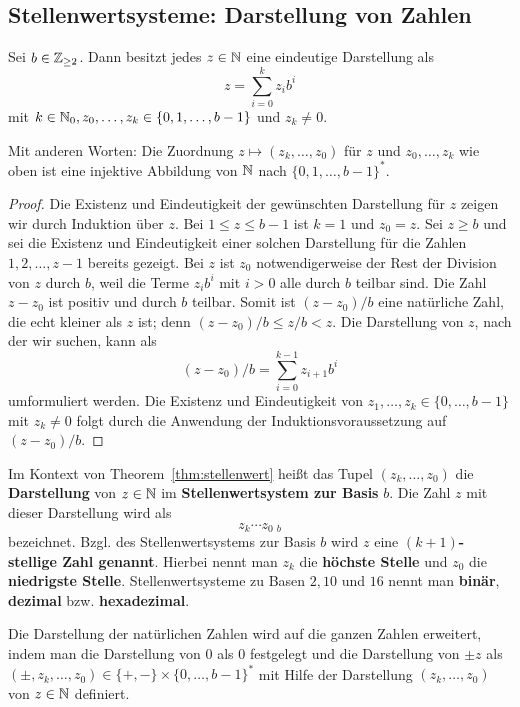 \subsection{Stellenwertsysteme: Darstellung von Zahlen}

\begin{thm} \label{thm:stellenwert}
	Sei $b \in \mathbb{Z}_{\ge 2}$. Dann besitzt jedes $z \in \mathbb{N}$ eine eindeutige Darstellung als 
	\begin{equation}\label{z:zur:Basis:b}
		z = \sum_{i=0}^k z_i b^i
	\end{equation}
	mit $k \in \mathbb{N}_0, z_0,\ldots,z_k \in \{0,1,\ldots,b-1\}$ und $z_k \ne 0$.
	
	 Mit anderen Worten: Die Zuordnung $z \mapsto (z_k,\ldots,z_0)$ für $z$ und $z_0,\ldots,z_k$ wie oben ist eine injektive Abbildung von $\mathbb{N}$ nach $\{0,1,\ldots,b-1\}^\ast$.
\end{thm}
\begin{proof}
 	Die Existenz und Eindeutigkeit der gewünschten Darstellung für $z$ zeigen wir durch Induktion über $z$. Bei $1 \le z \le b-1$ ist $k=1$ und $z_0=z$. Sei $z \geq b$ und sei die Existenz und Eindeutigkeit einer solchen Darstellung für die Zahlen $1,2,\ldots,z-1$ bereits gezeigt. Bei $z$ ist $z_0$ notwendigerweise der Rest der Division von $z$ durch $b$, weil die Terme $z_i b^i$ mit $i>0$ alle durch $b$ teilbar sind. Die Zahl $z-z_0$ ist positiv und durch $b$ teilbar. Somit ist $(z-z_0) / b$ eine natürliche Zahl, die echt kleiner als $z$ ist; denn $(z-z_0)/b \le z / b < z$. Die Darstellung von $z$, nach der wir suchen, kann als 
 	\[
 		(z-z_0)/b = \sum_{i=0}^{k-1} z_{i+1} b^i
 	\]
 	umformuliert werden. Die Existenz und Eindeutigkeit von $z_1,\ldots,z_k \in \{0,\ldots,b-1\}$ mit $z_k \ne 0$ folgt durch die Anwendung der Induktionsvoraussetzung auf $(z-z_0)/b$. 
\end{proof} 

\begin{defn}
	Im Kontext von Theorem~\ref{thm:stellenwert} heißt das Tupel $(z_k,\ldots,z_0)$ die \textbf{Darstellung} von $z \in \mathbb{N}$ im \textbf{Stellenwertsystem zur Basis} $b$. Die Zahl $z$ mit dieser Darstellung wird als 
	\[	
			z_k \cdots z_0 \ {}_{b}
	\]
	bezeichnet. Bzgl. des Stellenwertsystems zur Basis $b$ wird $z$ eine \textbf{$(k+1)$-stellige Zahl genannt}. Hierbei nennt man $z_k$ die \textbf{höchste Stelle} und $z_0$ die \textbf{niedrigste Stelle}.  Stellenwertsysteme zu Basen $2, 10$ und $16$ nennt man \textbf{binär}, \textbf{dezimal} bzw. \textbf{hexadezimal}. 
	
	Die Darstellung der natürlichen Zahlen wird auf die ganzen Zahlen erweitert, indem man die Darstellung von $0$ als $0$ festgelegt und die Darstellung von $\pm z$ als $(\pm ,z_k,\ldots,z_0) \in \{+,-\} \times \{0,\ldots,b-1\}^\ast$ mit Hilfe der Darstellung $(z_k,\ldots,z_0)$  von $z \in \mathbb{N}$ definiert. 
\end{defn} 

